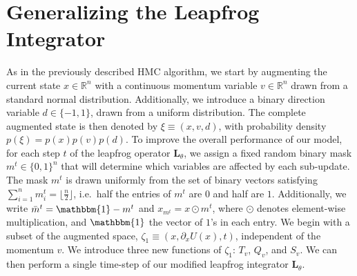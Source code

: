\documentclass[../main.tex]{subfiles}
\begin{document}
\section{Generalizing the Leapfrog Integrator}
\label{sec:generalizing_lf}
As in the previously described HMC algorithm, we start by augmenting the
current state $x \in \mathbb{R}^n$ with a continuous momentum variable $v \in
\mathbb{R}^{n}$ drawn from a standard normal distribution.
%
Additionally, we introduce a binary direction variable $d \in \{ -1, 1\}$,
drawn from a uniform distribution. 
%
The complete augmented state is then denoted by $\xi \equiv (x, v, d)$, with
probability density $p(\xi) = p(x) p(v)
p(d)$.
%
To improve the overall performance of our model, for each step $t$ of the
leapfrog operator $\mathbf{L}_{\theta}$, we assign a fixed random binary mask
$m^{t} \in{\{0, 1\}}^n$ that will determine which variables are affected by
each sub-update.
%
The mask $m^t$ is drawn uniformly from the set of binary vectors satisfying
$\sum_{i=1}^{n} m_{i}^{t} = \lfloor \frac{n}{2}\rfloor$, i.e.\ half the entries
of $m^t$ are $0$ and half are $1$.
%
Additionally, we write $\bar m^{t} = \mathbbm{1} - m^{t}$ and $x_{m^t} = x
\odot m^{t}$, where $\odot$ denotes element-wise multiplication, and
$\mathbbm{1}$ the vector of $1$'s in each entry.
%
%
We begin with a subset of the augmented space, $\zeta_1 \equiv (x, \partial_{x}
U(x), t)$, independent of the momentum $v$.
%
We introduce three new functions of $\zeta_1$: $T_v$, $Q_v$, and $S_v$.
%
We can then perform a single time-step of our modified leapfrog integrator
$\mathbf{L}_{\theta}$.
%
\end{document}
